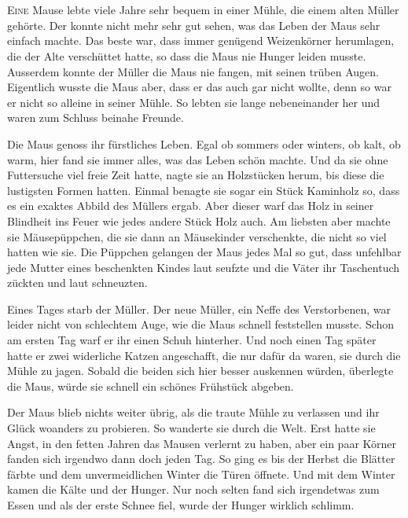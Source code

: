 \chapter*{}
\lettrine[lines=3]{\color{DeepPink}E}{ine} Mause lebte viele Jahre sehr bequem in einer Mühle, die einem alten Müller gehörte. Der konnte nicht mehr sehr gut sehen, was das Leben der Maus sehr einfach machte. Das beste war, dass immer genügend Weizenkörner herumlagen, die der Alte verschüttet hatte, so dass die Maus nie Hunger leiden musste. Ausserdem konnte der Müller die Maus nie fangen, mit seinen trüben Augen. Eigentlich wusste die Maus aber, dass er das auch gar nicht wollte, denn so war er nicht so alleine in seiner Mühle. So lebten sie lange nebeneinander her und waren zum Schluss beinahe Freunde. 

Die Maus genoss ihr fürstliches Leben. Egal ob sommers oder winters, ob kalt, ob warm, hier fand sie immer alles, was das Leben schön machte. Und da sie ohne Futtersuche viel freie Zeit hatte, nagte sie an Holzstücken herum, bis diese die lustigsten Formen hatten. Einmal benagte sie sogar ein Stück Kaminholz so, dass es ein exaktes Abbild des Müllers ergab. Aber dieser warf das Holz in seiner Blindheit ins Feuer wie jedes andere Stück Holz auch. Am liebsten aber machte sie Mäusepüppchen, die sie dann an Mäusekinder verschenkte, die nicht so viel hatten wie sie. Die Püppchen gelangen der Maus jedes Mal so gut, dass unfehlbar jede Mutter eines beschenkten Kindes laut seufzte und die Väter ihr Taschentuch zückten und laut schneuzten. 

Eines Tages starb der Müller. Der neue Müller, ein Neffe des Verstorbenen, war leider nicht von schlechtem Auge, wie die Maus schnell feststellen musste. Schon am ersten Tag warf er ihr einen Schuh hinterher. Und noch einen Tag später hatte er zwei widerliche Katzen angeschafft, die nur dafür da waren, sie durch die Mühle zu jagen. Sobald die beiden sich hier besser auskennen würden, überlegte die Maus, würde sie schnell ein schönes Frühstück abgeben.

Der Maus blieb nichts weiter übrig, als die traute Mühle zu verlassen und ihr Glück woanders zu probieren. So wanderte sie durch die Welt. Erst hatte sie Angst, in den fetten Jahren das Mausen verlernt zu haben, aber ein paar Körner fanden sich irgendwo dann doch jeden Tag. So ging es bis der Herbst die Blätter färbte und dem unvermeidlichen Winter die Türen öffnete. Und mit dem Winter kamen die Kälte und der Hunger. Nur noch selten fand sich irgendetwas zum Essen und als der erste Schnee fiel, wurde der Hunger wirklich schlimm. 

